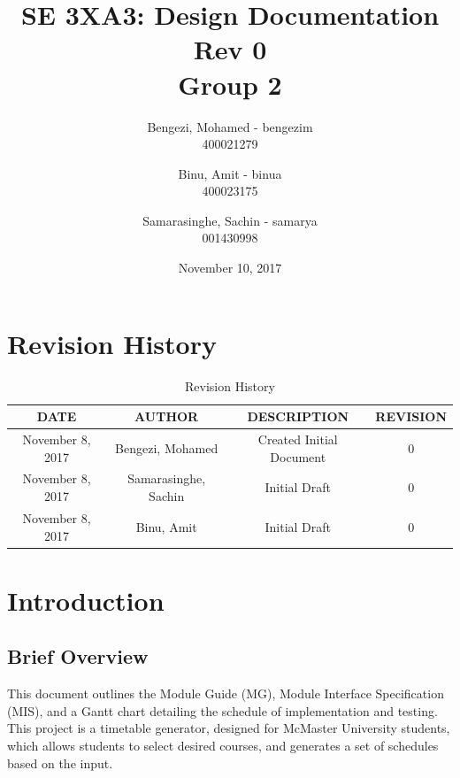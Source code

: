 \documentclass[11pt, oneside]{article}
\title{SE 3XA3: Design Documentation Rev 0 \\ \textbf{Group 2}
}
\author{Bengezi, Mohamed - bengezim\\
		400021279
		\and
		Binu, Amit - binua\\
		400023175
		\and
		Samarasinghe, Sachin - samarya \\
		001430998}
\date{November 10, 2017}
\begin{document}
\maketitle
\newpage

\tableofcontents\par
\listoftables
\listoffigures
\newpage


\section{Revision History}

\begin{table}[hp]
\caption{Revision History}
\begin{center}
\label{tab:}
\begin{tabular}{|c|c|c|c|}
\hline
\textbf{DATE} & \textbf{AUTHOR} & \textbf{DESCRIPTION} & \textbf{REVISION}\\
\hline
November 8, 2017 & Bengezi, Mohamed & Created Initial Document & 0\\
\hline
November 8, 2017 & Samarasinghe, Sachin & Initial Draft & 0\\
\hline
November 8, 2017 & Binu, Amit & Initial Draft & 0\\
\hline
\end{tabular}
\end{center}
\label{default}
\end{table}




\newpage
\section{Introduction}
\subsection{Brief Overview}
\tab This document outlines the Module Guide (MG), Module Interface Specification (MIS), and a Gantt chart detailing the schedule of implementation and testing. This project is a timetable generator, designed for McMaster University students, which allows students to select desired courses, and generates a set of schedules based on the input. 
\end{document}
